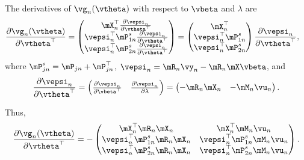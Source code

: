 The derivatives of $\vg_n(\vtheta)$ with respect to $\vbeta$ and $\lambda$ are
\begin{equation*}
  \begin{aligned}
    \frac{\partial \vg_n(\vtheta)}{\partial \vtheta ^\top} & = \begin{pmatrix}
    \mX_n^\top\frac{\partial \vepsi_n}{\partial \vtheta^\top} \\
    \vepsi_n^\top\mP_{1n}^s\frac{\partial \vepsi_n}{\partial \vtheta^\top} \\
     \vepsi_n^\top\mP_{2n}^s\frac{\partial \vepsi_n}{\partial \vtheta^\top}
\end{pmatrix} = \begin{pmatrix}
    \mX_n^\top \\
    \vepsi_n^\top \mP_{1n}^s \\
     \vepsi_n^\top \mP_{2n}^s
\end{pmatrix}\frac{\partial \vepsi_n}{\partial \vtheta^\top}, 
  \end{aligned}
\end{equation*}
%
where $\mP_{jn}^s = \mP_{jn} + \mP_{jn}^\top$, $\vepsi_n = \mR_n\vy_n - \mR_n\mX\vbeta$, and 
\begin{equation*}
  \frac{\partial \vepsi_n}{\partial \vtheta^\top}  = \begin{pmatrix}
    \frac{\partial \vepsi_n}{\partial \vbeta^\top} & \frac{\partial \vepsi_n}{\partial \lambda} 
    \end{pmatrix}
= \begin{pmatrix}
      -\mR_n\mX_n & - \mM_n\vu_n
  \end{pmatrix}.
\end{equation*}

Thus, 
\begin{equation*}
\frac{\partial \vg_n(\vtheta)}{\partial \vtheta ^\top} = 
- \begin{pmatrix}
 \mX_n^\top\mR_n\mX_n & \mX_n^\top\mM_n\vu_n \\
 \vepsi_n^\top\mP_{1n}^s\mR_n\mX_n & \vepsi_n^\top\mP_{1n}^s\mM_n\vu_n \\
 \vepsi_n^\top\mP_{2n}^s\mR_n\mX_n & \vepsi_n^\top\mP_{2n}^s\mM_n\vu_n 
\end{pmatrix}.
\end{equation*}


